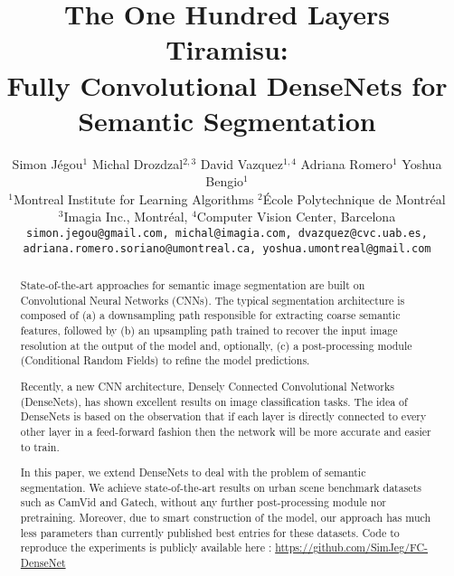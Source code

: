 \documentclass[10pt,twocolumn,letterpaper]{article}
\begin{document}
\title{The One Hundred Layers Tiramisu: \\ Fully Convolutional DenseNets for Semantic Segmentation}

\author{Simon J\'{e}gou$^1$ Michal Drozdzal$^{2,3}$ David Vazquez$^{1,4}$ Adriana Romero$^1$ Yoshua Bengio$^1$\\
$^1$Montreal Institute for Learning Algorithms $^2$\'{E}cole Polytechnique de Montr\'{e}al \\ $^3$Imagia Inc., Montr\'{e}al, $^4$Computer Vision Center, Barcelona \\
{\tt\small simon.jegou@gmail.com, michal@imagia.com, dvazquez@cvc.uab.es,} \\ {\tt \small adriana.romero.soriano@umontreal.ca, yoshua.umontreal@gmail.com}
}

\maketitle


\begin{abstract}
State-of-the-art approaches for semantic image segmentation are built on Convolutional Neural Networks (CNNs). The typical segmentation architecture is composed of (a) a downsampling path responsible for extracting coarse semantic features, followed by (b) an upsampling path trained to recover the input image resolution at the output of the model and, optionally, (c) a post-processing module (\eg Conditional Random Fields) to refine the model predictions. 

Recently, a new CNN architecture, Densely Connected Convolutional Networks (DenseNets), has shown excellent results on image classification tasks. The idea of DenseNets is based on the observation that if each layer is directly connected to every other layer in a feed-forward fashion then the network will be more accurate and easier to train.  

In this paper, we extend DenseNets to deal with the problem of semantic segmentation. We achieve state-of-the-art results on urban scene benchmark datasets such as CamVid and Gatech, without any further post-processing module nor pretraining. Moreover, due to smart construction of the model, our approach has much less parameters than currently published best entries for these datasets. Code to reproduce the experiments is publicly available here : \url{https://github.com/SimJeg/FC-DenseNet}

\end{abstract}
\end{document}
